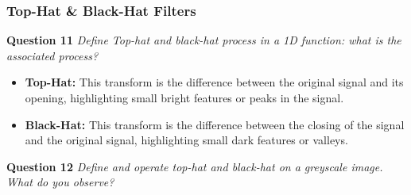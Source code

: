 \subsubsection{Top-Hat \& Black-Hat Filters}
\textbf{Question 11} \textit{Deﬁne Top-hat and black-hat process in a 1D function: what is the associated process?}

\begin{itemize}
    \item \textbf{Top-Hat:} This transform is the difference between the original signal and its opening, highlighting small bright features or peaks in the signal.

    \item \textbf{Black-Hat:} This transform is the difference between the closing of the signal and the original signal, highlighting small dark features or valleys.
\end{itemize}


\textbf{Question 12} \textit{Deﬁne and operate top-hat and black-hat on a greyscale image. What do you observe?}

